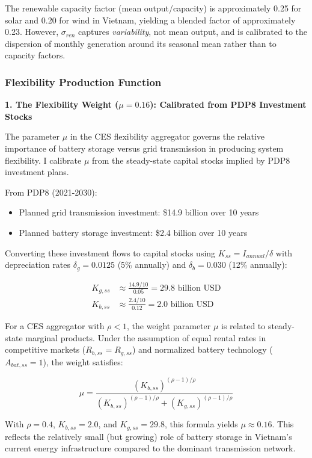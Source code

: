 \documentclass[12pt, a4paper]{article}
\begin{document}
The renewable capacity factor (mean output/capacity) is approximately 0.25 for solar and 0.20 for wind in Vietnam, yielding a blended factor of approximately 0.23. However, $\sigma_{ren}$ captures \textit{variability}, not mean output, and is calibrated to the dispersion of monthly generation around its seasonal mean rather than to capacity factors.

\subsubsection{Flexibility Production Function}

\textbf{1. The Flexibility Weight ($\mu = 0.16$): Calibrated from PDP8 Investment Stocks}

The parameter $\mu$ in the CES flexibility aggregator governs the relative importance of battery storage versus grid transmission in producing system flexibility. I calibrate $\mu$ from the steady-state capital stocks implied by PDP8 investment plans.

From PDP8 (2021-2030):
\begin{itemize}
    \item Planned grid transmission investment: \$14.9 billion over 10 years
    \item Planned battery storage investment: \$2.4 billion over 10 years
\end{itemize}

Converting these investment flows to capital stocks using $K_{ss} = I_{annual}/\delta$ with depreciation rates $\delta_g = 0.0125$ (5\% annually) and $\delta_b = 0.030$ (12\% annually):

\begin{align}
K_{g,ss} &\approx \frac{14.9/10}{0.05} = 29.8 \text{ billion USD} \\
K_{b,ss} &\approx \frac{2.4/10}{0.12} = 2.0 \text{ billion USD}
\end{align}

For a CES aggregator with $\rho < 1$, the weight parameter $\mu$ is related to steady-state marginal products. Under the assumption of equal rental rates in competitive markets ($R_{b,ss} = R_{g,ss}$) and normalized battery technology ($A_{bat,ss} = 1$), the weight satisfies:

\begin{equation}
\mu = \frac{(K_{b,ss})^{(\rho-1)/\rho}}{(K_{b,ss})^{(\rho-1)/\rho} + (K_{g,ss})^{(\rho-1)/\rho}}
\end{equation}

With $\rho = 0.4$, $K_{b,ss} = 2.0$, and $K_{g,ss} = 29.8$, this formula yields $\mu \approx 0.16$. This reflects the relatively small (but growing) role of battery storage in Vietnam's current energy infrastructure compared to the dominant transmission network.
\end{document}
